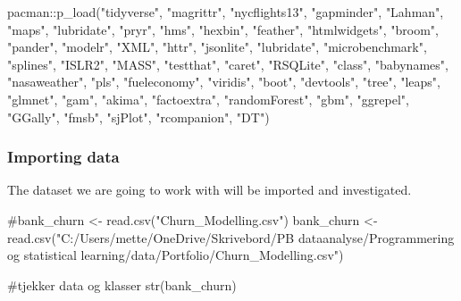 \documentclass[
  letterpaper,
  DIV=11,
  numbers=noendperiod]{scrartcl}
\newenvironment{Shaded}{\begin{snugshade}}{\end{snugshade}}
\newcommand{\CommentTok}[1]{\textcolor[rgb]{0.37,0.37,0.37}{#1}}
\newcommand{\FunctionTok}[1]{\textcolor[rgb]{0.28,0.35,0.67}{#1}}
\newcommand{\NormalTok}[1]{\textcolor[rgb]{0.00,0.23,0.31}{#1}}
\newcommand{\OtherTok}[1]{\textcolor[rgb]{0.00,0.23,0.31}{#1}}
\newcommand{\SpecialCharTok}[1]{\textcolor[rgb]{0.37,0.37,0.37}{#1}}
\newcommand{\StringTok}[1]{\textcolor[rgb]{0.13,0.47,0.30}{#1}}
\begin{document}
\begin{Shaded}
\begin{Highlighting}[]
\NormalTok{pacman}\SpecialCharTok{::}\FunctionTok{p\_load}\NormalTok{(}\StringTok{"tidyverse"}\NormalTok{, }\StringTok{"magrittr"}\NormalTok{, }\StringTok{"nycflights13"}\NormalTok{, }\StringTok{"gapminder"}\NormalTok{,}
               \StringTok{"Lahman"}\NormalTok{, }\StringTok{"maps"}\NormalTok{, }\StringTok{"lubridate"}\NormalTok{, }\StringTok{"pryr"}\NormalTok{, }\StringTok{"hms"}\NormalTok{, }\StringTok{"hexbin"}\NormalTok{,}
               \StringTok{"feather"}\NormalTok{, }\StringTok{"htmlwidgets"}\NormalTok{, }\StringTok{"broom"}\NormalTok{, }\StringTok{"pander"}\NormalTok{, }\StringTok{"modelr"}\NormalTok{,}
               \StringTok{"XML"}\NormalTok{, }\StringTok{"httr"}\NormalTok{, }\StringTok{"jsonlite"}\NormalTok{, }\StringTok{"lubridate"}\NormalTok{, }\StringTok{"microbenchmark"}\NormalTok{,}
               \StringTok{"splines"}\NormalTok{, }\StringTok{"ISLR2"}\NormalTok{, }\StringTok{"MASS"}\NormalTok{, }\StringTok{"testthat"}\NormalTok{,  }\StringTok{"caret"}\NormalTok{,}
               \StringTok{"RSQLite"}\NormalTok{, }\StringTok{"class"}\NormalTok{, }\StringTok{"babynames"}\NormalTok{, }\StringTok{"nasaweather"}\NormalTok{, }\StringTok{"pls"}\NormalTok{,}
               \StringTok{"fueleconomy"}\NormalTok{, }\StringTok{"viridis"}\NormalTok{, }\StringTok{"boot"}\NormalTok{, }\StringTok{"devtools"}\NormalTok{, }\StringTok{"tree"}\NormalTok{, }\StringTok{"leaps"}\NormalTok{,}
               \StringTok{"glmnet"}\NormalTok{, }\StringTok{"gam"}\NormalTok{, }\StringTok{"akima"}\NormalTok{, }\StringTok{"factoextra"}\NormalTok{, }\StringTok{"randomForest"}\NormalTok{, }\StringTok{"gbm"}\NormalTok{, }
               \StringTok{"ggrepel"}\NormalTok{, }\StringTok{"GGally"}\NormalTok{, }\StringTok{"fmsb"}\NormalTok{, }\StringTok{"sjPlot"}\NormalTok{, }\StringTok{"rcompanion"}\NormalTok{, }\StringTok{"DT"}\NormalTok{)}
\end{Highlighting}
\end{Shaded}

\subsubsection{Importing data}\label{importing-data}

The dataset we are going to work with will be imported and investigated.

\begin{Shaded}
\begin{Highlighting}[]
\CommentTok{\#bank\_churn \textless{}{-} read.csv("Churn\_Modelling.csv")}
\NormalTok{bank\_churn }\OtherTok{\textless{}{-}} \FunctionTok{read.csv}\NormalTok{(}\StringTok{"C:/Users/mette/OneDrive/Skrivebord/PB dataanalyse/Programmering og statistical learning/data/Portfolio/Churn\_Modelling.csv"}\NormalTok{)}


\CommentTok{\#tjekker data og klasser}
\FunctionTok{str}\NormalTok{(bank\_churn)}
\end{Highlighting}
\end{Shaded}
\end{document}
